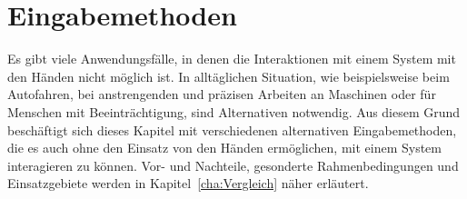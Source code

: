 \chapter{Eingabemethoden}
\label{cha:Eingabe}
Es gibt viele Anwendungsfälle, in denen die Interaktionen mit einem System mit den Händen nicht möglich ist. In alltäglichen Situation, wie beispielsweise beim Autofahren, bei anstrengenden und präzisen Arbeiten an Maschinen oder für Menschen mit Beeinträchtigung, sind Alternativen notwendig. Aus diesem Grund beschäftigt sich dieses Kapitel mit verschiedenen alternativen Eingabemethoden, die es auch ohne den Einsatz von den Händen ermöglichen, mit einem System interagieren zu können. Vor- und Nachteile, gesonderte Rahmenbedingungen und Einsatzgebiete werden in Kapitel~\ref{cha:Vergleich} näher erläutert.
